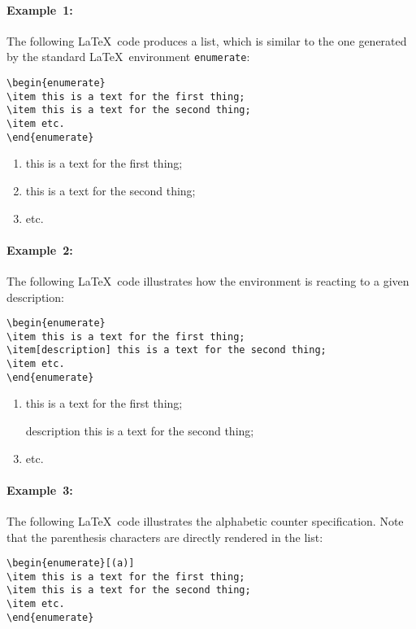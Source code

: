 \documentclass[book,taskpackage,specpackage,codepackage]{upmethodology-document}
\begin{document}
\paragraph{Example~1:} The following \LaTeX~code produces a list, which is similar to the one generated by the standard \LaTeX\ environment \texttt{enumerate}:
\begin{verbatim}
\begin{enumerate}
\item this is a text for the first thing;
\item this is a text for the second thing;
\item etc.
\end{enumerate}
\end{verbatim}

\begin{enumerate}
\item this is a text for the first thing;
\item this is a text for the second thing;
\item etc.
\end{enumerate}

\paragraph{Example~2:} The following \LaTeX~code illustrates how the environment is reacting to a given description:
\begin{verbatim}
\begin{enumerate}
\item this is a text for the first thing;
\item[description] this is a text for the second thing;
\item etc.
\end{enumerate}
\end{verbatim}

\begin{enumerate}
\item this is a text for the first thing;
\item[description] this is a text for the second thing;
\item etc.
\end{enumerate}

\paragraph{Example~3:} The following \LaTeX~code illustrates the alphabetic counter specification. Note that the parenthesis characters are directly rendered in the list:
\begin{verbatim}
\begin{enumerate}[(a)]
\item this is a text for the first thing;
\item this is a text for the second thing;
\item etc.
\end{enumerate}
\end{verbatim}
\end{document}
